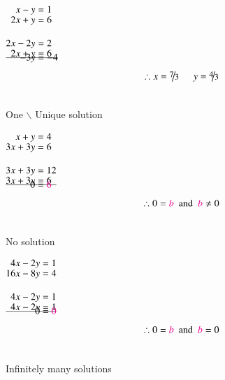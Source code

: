 \documentclass[12pt]{article}
\begin{document}
\begin{multicols}{3}\centering   
   $\begin{aligned}
       x-y&=1\\[-1ex] 2x+y&=6 \\[2ex] 2x-2y&=2\\[-1ex] 2x+y&=6 \\[-3ex]\cline{1-2}\\[-6ex]-3y&=-4
   \end{aligned}$
   \vspace{-1ex}
   $$\therefore x=\scalebox{1.2}{\nicefrac{$7$}{$3$}} \tabs y=\scalebox{1.2}{\nicefrac{$4$}{$3$}}$$
   
   \vspace{-2ex}
  \\[2ex]
   One $\backslash$ Unique solution

   \columnbreak

   $\begin{aligned}
      x+y&=4\\[-1ex] 3x+3y&=6 \\[2ex] 3x+3y&=12\\[-1ex] 3x+3y&=6\\[-3ex]\cline{1-2}\\[-6ex]0&=\pinkeq{6}
   \end{aligned}$
   $$\therefore 0=\text{\color{magenta}$b$} \text{ \ and \ } \text{\color{magenta}$b$} \neq 0$$
   
   \vspace{-2ex}
   \\[2ex]
   No solution
   
   \columnbreak
   
   $\begin{aligned}
      4x-2y&=1\\[-1ex] 16x-8y&=4 \\[2ex] 4x-2y&=1\\[-1ex] 4x-2y&=1\\[-3ex]\cline{1-2}\\[-6ex]0&=\pinkeq{0}
   \end{aligned}$
   $$\therefore 0=\text{\color{magenta}$b$} \text{ \ and \ } \text{\color{magenta}$b$}=0$$

   \vspace{-2ex}
   \\[2ex]
   Infinitely many solutions

\end{multicols}
\end{document}
